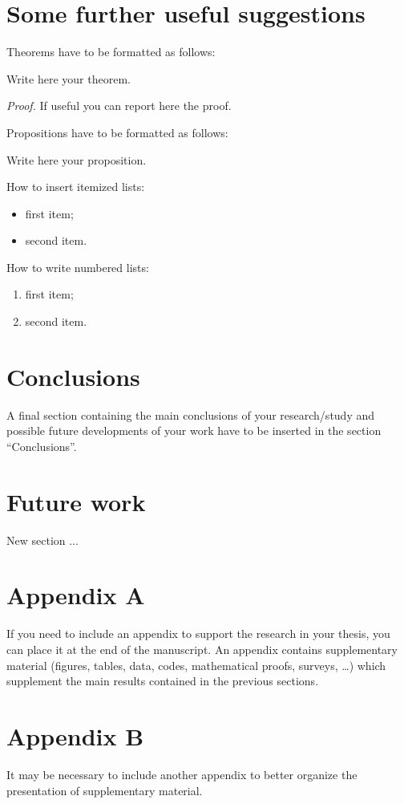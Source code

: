 \documentclass[11pt,a4paper]{article}
\begin{document}
\section{Some further useful suggestions}

Theorems have to be formatted as follows:
\begin{theorem}
\label{a_theorem}
Write here your theorem. 
\end{theorem}
\textit{Proof.} If useful you can report here the proof.
\vspace{0.3cm} %

Propositions have to be formatted as follows:
\begin{proposition}
Write here your proposition.
\end{proposition}
\vspace{0.3cm} %

How to insert itemized lists:
\begin{itemize}
    \item first item;
    \item second item.
\end{itemize}
How to write numbered lists:
\begin{enumerate}
    \item first item;
    \item second item.
\end{enumerate}

\section{Conclusions}
\color{black}
A final section containing the main conclusions of your research/study
and possible future developments of your work have to be inserted in the section ``Conclusions''.

\section{Future work}
\color{black}
New section ...

\appendix
\section{Appendix A}
If you need to include an appendix to support the research in your thesis, you can place it at the end of the manuscript.
An appendix contains supplementary material (figures, tables, data, codes, mathematical proofs, surveys, \dots)
which supplement the main results contained in the previous sections.

\section{Appendix B}
It may be necessary to include another appendix to better organize the presentation of supplementary material.

\end{document}

